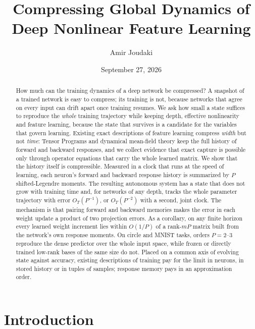 \documentclass[11pt]{article}
\title{{\fontsize{14}{17}\selectfont\bfseries
Compressing Global Dynamics of Deep Nonlinear Feature Learning}}
\author{Amir Joudaki}
\date{September 27, 2026}
\theoremstyle{definition}
\theoremstyle{remark}
\begin{document}
\maketitle

\begin{abstract}
How much can the training dynamics of a deep network be compressed?  A snapshot
of a trained network is easy to compress; its training is not, because networks
that agree on every input can drift apart once training resumes.  We ask how
small a state suffices to reproduce the \emph{whole} training trajectory while
keeping depth, effective nonlinearity and feature learning, because the state
that survives is a candidate for the variables that govern learning.  Existing
exact descriptions of feature learning compress \emph{width} but not
\emph{time}: Tensor Programs and dynamical mean-field theory keep the full history
of forward and backward responses, and we collect evidence that exact capture is
possible only through operator equations that carry the whole learned matrix.
We show that the history itself is compressible.  Measured in a clock that runs
at the speed of learning, each neuron's forward and backward response history is
summarized by $P$ shifted-Legendre moments.  The resulting autonomous system has
a state that does not grow with training time and, for networks of any depth,
tracks the whole parameter trajectory with error $O_T(P^{-1})$, or $O_T(P^{-2})$
with a second, joint clock.  The mechanism is that pairing forward and backward
memories makes the error in each weight update a product of two projection
errors.  As a corollary, on any finite horizon every learned weight increment
lies within $O(1/P)$ of a rank-$mP$ matrix built from the network's own response
moments.  On circle and MNIST tasks, orders $P=2$--$3$ reproduce the dense
predictor over the whole input space, while frozen or directly trained low-rank
bases of the same size do not.  Placed on a common axis of evolving state
against accuracy, existing descriptions of training pay for the limit in
neurons, in stored history or in tuples of samples; response memory pays in an
approximation order.
\end{abstract}

\section{Introduction}
\end{document}

